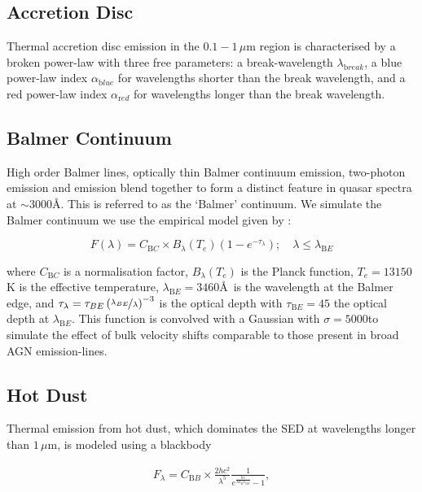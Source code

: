 \subsection{Accretion Disc}

Thermal accretion disc emission in the $0.1 - 1$\,$\mu$m region is characterised by a broken power-law with three free parameters: a break-wavelength $\lambda_{\mathrm break}$, a blue power-law index $\alpha_{\mathrm blue}$ for wavelengths shorter than the break wavelength, and a red power-law index $\alpha_{\mathrm red}$ for wavelengths longer than the break wavelength.

\subsection{Balmer Continuum}

High order Balmer lines, optically thin Balmer continuum emission, two-photon emission and  emission blend together to form a distinct feature in quasar spectra at $\sim3000$\AA.
This is referred to as the `Balmer' continuum. 
We simulate the Balmer continuum we use the empirical model given by \citet{grandi82}: 

\begin{equation}
  F(\lambda) = C_{\mathrm BC} \times B_\lambda(T_e)(1-e^{-\tau_\lambda}); \quad \lambda \leq \lambda_{\mathrm BE}
\end{equation}

where $C_{\mathrm BC}$ is a normalisation factor, $B_\lambda(T_e)$ is the Planck function, $T_e=13150$K is the effective temperature, $\lambda_{\mathrm BE}=3460$\AA\, is the wavelength at the Balmer edge, and $\tau_\lambda = \tau_{BE}\left( \nicefrac{\lambda_{BE}} {\lambda} \right)^{-3}$ is the optical depth with $\tau_{\mathrm BE}=45$ the optical depth at $\lambda_{\mathrm BE}$. 
This function is convolved with a Gaussian with $\sigma=5000$\kms to simulate the effect of bulk velocity shifts comparable to those present in broad AGN emission-lines. 

\subsection{Hot Dust}

Thermal emission from hot dust, which dominates the SED at wavelengths longer than $1$\,$\mu$m, is modeled using a blackbody

\begin{eqnarray}  
  F_\lambda = C_{\mathrm BB} \times \frac{2 hc^2}{\lambda^5}\frac{1}{ e^{\frac{hc}{\lambda k_\mathrm{B}T_{\mathrm BB}}} - 1}, 
\end{eqnarray}

